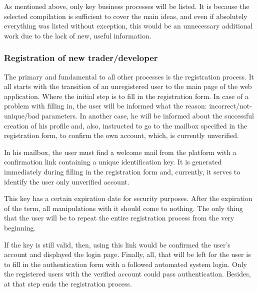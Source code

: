 \documentclass[thesis=B,english]{FITthesis}[2019/03/06]
\begin{document}
As mentioned above, only key business processes will be listed. It is because the selected compilation is sufficient to cover the main ideas, and even if absolutely everything was listed without exception, this would be an unnecessary additional work due to the lack of new, useful information.

\subsubsection{Registration of new trader/developer}
The primary and fundamental to all other processes is the registration process. It all starts with the transition of an unregistered user to the main page of the web application. Where the initial step is to fill in the registration form. In case of a problem with filling in, the user will be informed what the reason: incorrect/not-unique/bad parameters. In another case, he will be informed about the successful creation of his profile and, also, instructed to go to the mailbox specified in the registration form, to confirm the own account, which, is currently unverified.

In his mailbox, the user must find a welcome mail from the platform with a confirmation link containing a unique identification key. It is generated immediately during filling in the registration form and, currently, it serves to identify the user only unverified account.

This key has a certain expiration date for security purposes. After the expiration of the term, all manipulations with it should come to nothing. The only thing that the user will be to repeat the entire registration process from the very beginning.

If the key is still valid, then, using this link would be confirmed the user's account and displayed the login page.
Finally, all, that will be left for the user is to fill in the authentication form with a followed automated system login. Only the registered users with the verified account could pass authentication. 
Besides, at that step ends the registration process.
\end{document}

